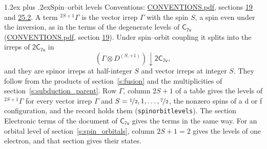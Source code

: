 \documentclass[10pt,a4paper]{article}
\makeatletter
\renewcommand\section{\@startsection{section}{1}{\z@}{-3ex plus -1ex minus -.2ex}%
  {1.2ex plus .2ex}{\normalfont\large\sffamily\bfseries\color{parttitle}}}
\numberwithin{equation}{section}
\newcommand{\grp}[1]{\mathsf{#1}}
\newcommand{\restr}[2]{#1\!\downarrow#2}
\newcommand{\irrJp}[2]{D^{(#1,#2)}}
\newcommand{\irrprod}{\otimes}
\newcommand{\term}[2]{{}^{#1}#2}
\makeatother
\begin{document}
\section{Spin--orbit levels}\label{s:spin_orbit}
Conventions: \href{../../CONVENTIONS.pdf}{CONVENTIONS.pdf}, sections \href{../../../rotation/CONVENTIONS.pdf\#conv.19}{19} and \href{../../CONVENTIONS.pdf\#conv.25.2}{25.2}.
\leavevmode\label{n:local.spin}\label{n:symbol.term}A term $\term{2S+1}{\Gamma}$ is the vector irrep $\Gamma$ with the spin $S$, a spin even under the inversion, as in the terms of the degenerate levels of \href{../../../rotation/data/pdf/C7v.pdf}{$\grp{C_{7v}}$} (\href{../../CONVENTIONS.pdf}{CONVENTIONS.pdf}, section \href{../../../rotation/CONVENTIONS.pdf\#conv.19}{19}). Under spin--orbit coupling it splits into the irreps of $\grp{2C_{7v}}$ in
\begin{equation}\label{e:spinorbit}\restr{(\Gamma \irrprod \irrJp{S}{+1})}{\grp{2C_{7v}}},\end{equation}
and they are spinor irreps at half-integer $S$ and vector irreps at integer $S$. They follow from the products of section~\ref{s:fusion} and the multiplicities of section~\ref{s:subduction_parent}. Row $\Gamma$, column $2S + 1$ of a table gives the levels of $\term{2S+1}{\Gamma}$ for every vector irrep $\Gamma$ and $S = \nicefrac{1}{2}, 1, \dots, \nicefrac{7}{2}$, the nonzero spins of a d or f configuration, and the record holds them (\texttt{spinorbitlevels}). The section Electronic terms of the document of \href{../../../rotation/data/pdf/C7v.pdf}{$\grp{C_{7v}}$} gives the terms in the same way. For an orbital level of section~\ref{s:spin_orbitals}, column $2S + 1 = 2$ gives the levels of one electron, and that section gives their states.
\end{document}
